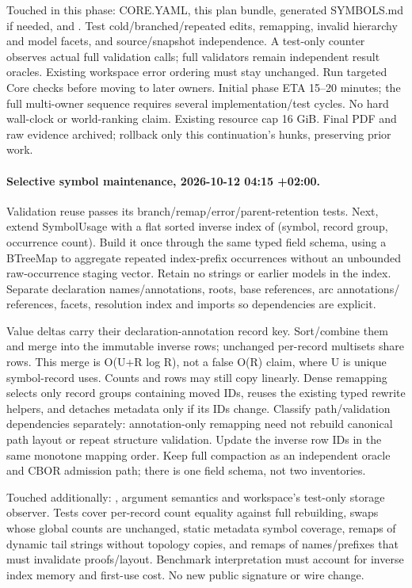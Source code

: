 \documentclass[11pt,a4paper]{article}
\begin{document}
Touched in this phase: CORE.YAML, this plan bundle, generated SYMBOLS.md if
needed,  and .
Test cold/branched/repeated edits, remapping, invalid hierarchy and model facets,
and source/snapshot independence. A test-only counter observes actual full
validation calls; full validators remain independent result oracles. Existing
workspace error ordering must stay unchanged. Run targeted Core checks before
moving to later owners. Initial phase ETA 15--20 minutes; the full multi-owner
sequence requires several implementation/test cycles. No hard wall-clock or
world-ranking claim. Existing resource cap 16 GiB. Final PDF and raw evidence
archived; rollback only this continuation's hunks, preserving prior work.

\paragraph{Selective symbol maintenance, 2026-10-12 04:15 +02:00.}
Validation reuse passes its branch/remap/error/parent-retention tests. Next,
extend SymbolUsage with a flat sorted inverse index of (symbol, record group,
occurrence count). Build it once through the same typed field schema, using a
BTreeMap to aggregate repeated index-prefix occurrences without an unbounded
raw-occurrence staging vector. Retain no strings or earlier models in the index.
Separate declaration names/annotations, roots, base references, arc annotations/
references, facets, resolution index and imports so dependencies are explicit.

Value deltas carry their declaration-annotation record key. Sort/combine them and
merge into the immutable inverse rows; unchanged per-record multisets share rows.
This merge is O(U+R log R), not a false O(R) claim, where U is unique symbol-record
uses. Counts and rows may still copy linearly. Dense remapping selects only record
groups containing moved IDs, reuses the existing typed rewrite helpers, and
detaches metadata only if its IDs change. Classify path/validation dependencies
separately: annotation-only remapping need not rebuild canonical path layout or
repeat structure validation. Update the inverse row IDs in the same monotone
mapping order. Keep full compaction as an independent oracle and CBOR admission
path; there is one field schema, not two inventories.

Touched additionally: ,
 argument semantics and workspace's test-only storage
observer. Tests cover per-record count equality against full rebuilding, swaps
whose global counts are unchanged, static metadata symbol coverage, remaps of
dynamic tail strings without topology copies, and remaps of names/prefixes that
must invalidate proofs/layout. Benchmark interpretation must account for inverse
index memory and first-use cost. No new public signature or wire change.
\end{document}
